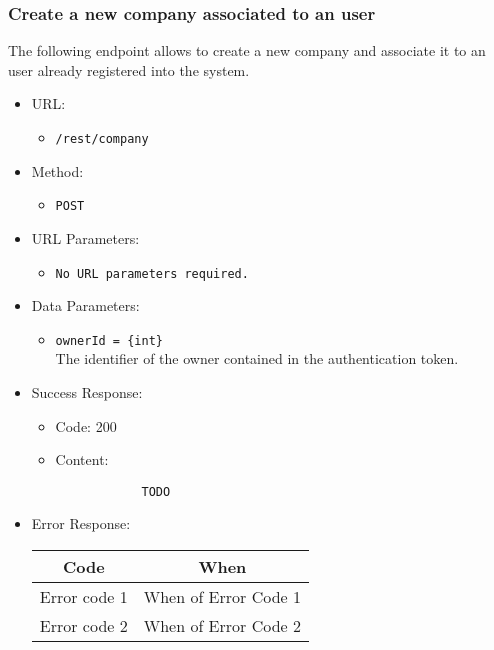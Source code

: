\subsubsection*{Create a new company associated to an user}

The following endpoint allows to create a new company and associate it to an user already registered into the system.

\begin{itemize}
    
    \item URL: 
    \begin{itemize}
        \item \texttt{/rest/company}
    \end{itemize}
    
    \item Method: 
    \begin{itemize}
        \item \texttt{POST}
    \end{itemize}
    
    \item URL Parameters: 
    \begin{itemize}
        \item \texttt{No URL parameters required.}
    \end{itemize}
    
    \item Data Parameters: 
    \begin{itemize}
        \item \texttt{ownerId = \{int\}} \\
        The identifier of the owner contained in the authentication token.    
    \end{itemize}

    \item Success Response: 
    \begin{itemize}
        \item Code: 200
        \item Content:
        \begin{lstlisting}
            TODO
        \end{lstlisting} 
    \end{itemize}
    
    \item Error Response:
    \begin{table}[!h]
    \centering 
    \begin{tabular}{|c|c|}
    \hline
    \multicolumn{1}{|c|}{\textbf{Code}} & \multicolumn{1}{c|}{\textbf{When}} \\ \hline
    Error code 1 & When of Error Code 1 \\\hline
    Error code 2 & When of Error Code 2 \\\hline
    \end{tabular} 
    \end{table} 
    
\end{itemize}


